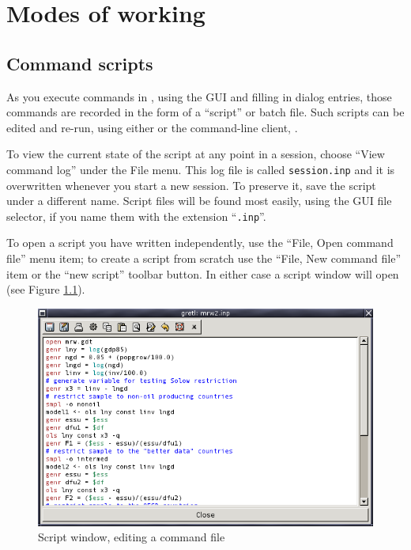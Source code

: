 \chapter{Modes of working}
\label{modes}



\section{Command scripts}
\label{scripts}

As you execute commands in , using the GUI and filling in
dialog entries, those commands are recorded in the form of a
``script'' or batch file.  Such scripts can be edited and re-run,
using either  or the command-line client, .

To view the current state of the script at any point in a 
session, choose ``View command log'' under the File menu. This log
file is called \verb+session.inp+ and it is overwritten whenever you
start a new session.  To preserve it, save the script under a
different name.  Script files will be found most easily, using the GUI
file selector, if you name them with the extension ``\verb+.inp+''.

To open a script you have written independently, use the ``File, Open
command file'' menu item; to create a script from scratch use the
``File, New command file'' item or the ``new script'' toolbar button.
In either case a script window will open (see Figure
\ref{fig-scriptwin}).

\begin{figure}[htbp]
  \caption{Script window, editing a command file}
  \label{fig-scriptwin}
  \begin{center}
    \includegraphics[scale=0.5]{figures/scriptwin}
  \end{center}
\end{figure}

